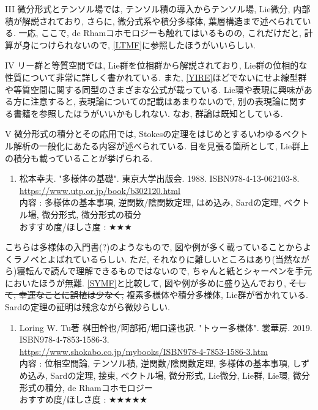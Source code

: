 \documentclass[10pt,a4paper]{jsarticle}
\begin{document}
    III 微分形式とテンソル場では, テンソル積の導入からテンソル場, Lie微分, 内部積が解説されており, さらに, 微分式系や積分多様体, 葉層構造まで述べられている. 一応, ここで, de Rhamコホモロジーも触れてはいるものの, これだけだと, 計算が身につけられないので, \ref{LTMF}に参照したほうがいいらしい. \par
    IV リー群と等質空間では, Lie群を位相群から解説されており, Lie群の位相的な性質について非常に詳しく書かれている. また, \ref{YIRE}ほどでないにせよ線型群や等質空間に関する同型のさまざまな公式が載っている. Lie環や表現に興味がある方に注意すると, 表現論についての記載はあまりないので, 別の表現論に関する書籍を参照したほうがいいかもしれない. なお, 群論は既知としている. \par
    V 微分形式の積分とその応用では, Stokesの定理をはじめとするいわゆるベクトル解析の一般化にあたる内容が述べられている. 目を見張る箇所として, Lie群上の積分も載っていることが挙げられる. 
    \begin{enumerate}
        \renewcommand{\theenumi}{[MF\arabic{enumi}]}
        \renewcommand{\labelenumi}{\theenumi}
        \setcounter{enumi}{1}
        \item \label{MYMF} 松本幸夫. "多様体の基礎". 東京大学出版会. 1988. ISBN978-4-13-062103-8. \\
        \url{https://www.utp.or.jp/book/b302120.html} \\
        内容 : 多様体の基本事項, 逆関数/陰関数定理, はめ込み, Sardの定理, ベクトル場, 微分形式, 微分形式の積分\\
        おすすめ度/ほしさ度 : $\bigstar \bigstar \bigstar $
    \end{enumerate}\par
    こちらは多様体の入門書(?)のようなもので, 図や例が多く載っていることからよくラノベとよばれているらしい. ただ, それなりに難しいところはあり(当然ながら)寝転んで読んで理解できるものではないので, ちゃんと紙とシャーペンを手元においたほうが無難. \ref{SYMF}と比較して, 図や例が多めに盛り込んでおり, \sout{そして, 幸運なことに誤植は少なく, }複素多様体や積分多様体, Lie群が省かれている. Sardの定理の証明は残念ながら微妙らしい. 
    \begin{enumerate}
        \renewcommand{\theenumi}{[MF\arabic{enumi}]}
        \renewcommand{\labelenumi}{\theenumi}
        \setcounter{enumi}{2}
        \item \label{LTMF} Loring W. Tu著 桝田幹也/阿部拓/堀口達也訳. "トゥー多様体". 裳華房. 2019. ISBN978-4-7853-1586-3. \\
        \url{https://www.shokabo.co.jp/mybooks/ISBN978-4-7853-1586-3.htm} \\
        内容 : 位相空間論, テンソル積, 逆関数/陰関数定理, 多様体の基本事項, しずめ込み, Sardの定理, 接束, ベクトル場, 微分形式, Lie微分, Lie群, Lie環, 微分形式の積分, de Rhamコホモロジー\\
        おすすめ度/ほしさ度 : $\bigstar \bigstar \bigstar \bigstar \bigstar $
    \end{enumerate}\par
\end{document}
